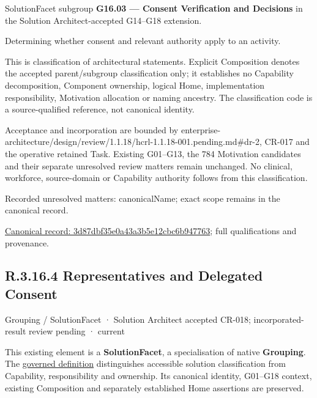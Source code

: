 SolutionFacet subgroup \textbf{G16.03 — Consent Verification and Decisions} in the Solution Architect-accepted G14–G18 extension.



Determining whether consent and relevant authority apply to an activity.



This is classification of architectural statements. Explicit Composition denotes the accepted parent/subgroup classification only; it establishes no Capability decomposition, Component ownership, logical Home, implementation responsibility, Motivation allocation or naming ancestry. The classification code is a source-qualified reference, not canonical identity.



Acceptance and incorporation are bounded by enterprise-architecture/design/review/1.1.18/hcrl-1.1.18-001.pending.md\#dr-2, CR-017 and the operative retained Task. Existing G01–G13, the 784 Motivation candidates and their separate unresolved review matters remain unchanged. No clinical, workforce, source-domain or Capability authority follows from this classification.


{\small Recorded unresolved matters: canonicalName; exact scope remains in the canonical record.}\par
{\footnotesize \href{../../../../../../../continuum/grouping/3d87dbf35e0a43a3b5e12cbc6b947763.md}{Canonical record: 3d87dbf35e0a43a3b5e12cbc6b947763}; full qualifications and provenance.}\par
\subsection*{R.3.16.4 Representatives and Delegated Consent}
\label{navigation:R.3.16.4}

\label{element:392c07b6a5ba4fc7bd5c19910437da98}
{\small Grouping / SolutionFacet · Solution Architect accepted CR-018; incorporated-result review pending · current}\par

This existing element is a \textbf{SolutionFacet}, a specialisation of native
\textbf{Grouping}. The \href{\detokenize{../../../../../../../governance/continuum-representation.md#solutionfacet-classification--1119-candidate}}{governed definition}
distinguishes accessible solution classification from Capability, responsibility
and ownership. Its canonical identity, G01–G18 context, existing Composition
and separately established Home assertions are preserved.



